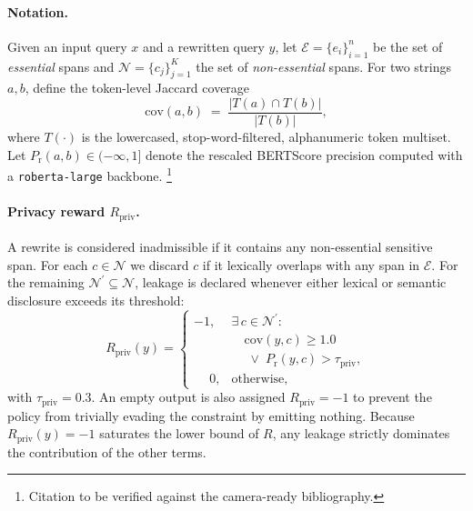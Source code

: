 \paragraph{Notation.}
Given an input query $x$ and a rewritten query $y$, let
$\mathcal{E}=\{e_i\}_{i=1}^{n}$ be the set of \emph{essential} spans
and $\mathcal{N}=\{c_j\}_{j=1}^{K}$ the set of \emph{non-essential}
spans. For two strings $a, b$, define the token-level Jaccard coverage
\begin{equation}
  \mathrm{cov}(a, b) \;=\; \frac{|T(a) \cap T(b)|}{|T(b)|},
\end{equation}
where $T(\cdot)$ is the lowercased, stop-word-filtered, alphanumeric
token multiset. Let $P_{\text{r}}(a, b) \in (-\infty, 1]$ denote the
rescaled BERTScore precision \citep{zhang2020bertscore} computed with
a \texttt{roberta-large} backbone.%
\footnote{Citation to be verified against the camera-ready bibliography.}

\paragraph{Privacy reward $R_{\text{priv}}$.}
A rewrite is considered inadmissible if it contains any non-essential
sensitive span. For each $c \in \mathcal{N}$ we discard $c$ if it
lexically overlaps with any span in $\mathcal{E}$. For the remaining
$\mathcal{N}^\prime \subseteq \mathcal{N}$, leakage is declared
whenever either lexical or semantic disclosure exceeds its threshold:
\begin{equation}
  R_{\text{priv}}(y) =
  \begin{cases}
    -1, & \exists\, c \in \mathcal{N}^\prime:\\
        & \quad \mathrm{cov}(y, c) \geq 1.0 \\
        & \quad\;\lor\; P_{\text{r}}(y, c) > \tau_{\text{priv}},\\[2pt]
    \phantom{-}0, & \text{otherwise},
  \end{cases}
\end{equation}
with $\tau_{\text{priv}} = 0.3$. An empty output is also assigned
$R_{\text{priv}} = -1$ to prevent the policy from trivially evading
the constraint by emitting nothing. Because $R_{\text{priv}}(y) = -1$
saturates the lower bound of $R$, any leakage strictly dominates the
contribution of the other terms.

